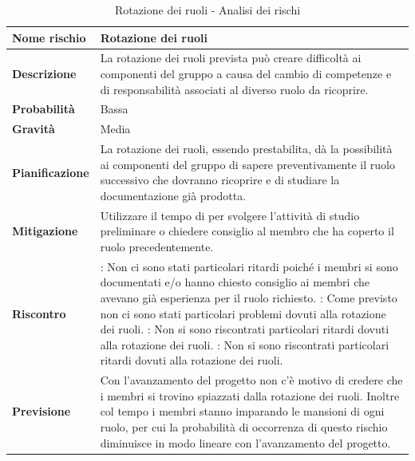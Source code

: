 \documentclass[12pt,a4paper]{article}
\begin{document}
\begin{table}[H]
	\begin{center}
		\begin{tabular}{p{} p{}}
			\toprule
			\textbf{Nome rischio} & \textbf{Rotazione dei ruoli} \\
			\midrule
			\midrule
			\textbf{Descrizione} & La rotazione dei ruoli prevista può creare difficoltà ai 
                componenti del gruppo a causa del cambio di competenze e di responsabilità 
                associati al diverso ruolo da ricoprire. \\
			\midrule
			\textbf{Probabilità} & Bassa \\
			\midrule
			\textbf{Gravità} & Media \\
			\midrule
			\textbf{Pianificazione} &  La rotazione dei ruoli, essendo prestabilita, dà la possibilità ai componenti del gruppo di sapere preventivamente il ruolo successivo che dovranno ricoprire e di studiare la documentazione già prodotta. \\
			\midrule
			\textbf{Mitigazione} & Utilizzare il tempo di \mgls{slack} per svolgere l'attività di studio preliminare o chiedere consiglio al membro che ha coperto il ruolo precedentemente. \\
            \midrule
            \textbf{Riscontro} & 
                \textbf{\FA{}}: Non ci sono stati particolari ritardi poiché i membri si sono documentati 
                    e/o hanno chiesto consiglio ai membri che avevano già esperienza per il ruolo richiesto. \newline
                \textbf{\FAD{}}: Come previsto non ci sono stati particolari problemi dovuti alla rotazione
                    dei ruoli. \newline
                \textbf{\FPA{}}: Non si sono riscontrati particolari ritardi dovuti alla rotazione dei ruoli. \newline
                \textbf{\FPD{}}: Non si sono riscontrati particolari ritardi dovuti alla rotazione dei ruoli. \\
            \midrule
            \textbf{Previsione} & Con l'avanzamento del progetto non c'è motivo di credere che i membri si trovino spiazzati dalla rotazione dei ruoli. Inoltre col tempo i membri stanno imparando le mansioni di ogni ruolo, per cui la probabilità di occorrenza di questo rischio diminuisce in modo lineare con l'avanzamento del progetto. \\
			\bottomrule
		\end{tabular}
		\caption{Rotazione dei ruoli - Analisi dei rischi}
	\end{center}
\end{table}
\end{document}

